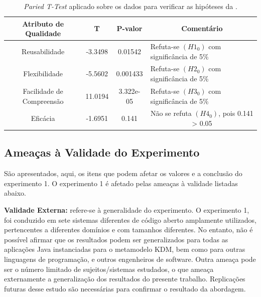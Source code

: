 \begin{table}[]
\centering
\caption{\textit{Paried T-Test} aplicado sobre os dados para verificar as hipóteses da .}
\label{tab:experimento_1_10_15}
\begin{tabular}{|m{1cm}|l|l|m{7.1cm}|}
\hline
\multicolumn{1}{|c|}{Atributo de Qualidade} & \multicolumn{1}{c|}{T} & \multicolumn{1}{c|}{P-valor} & \multicolumn{1}{c|}{Comentário} \\ \hline
\multicolumn{1}{|c|}{Reusabilidade} & \multicolumn{1}{c|}{-3.3498} & \multicolumn{1}{c|}{0.01542} & Refuta-se \textbf{$(H1_{0})$} com significância de 5\%\\ \hline
\multicolumn{1}{|c|}{Flexibilidade} &\multicolumn{1}{c|}{-5.5602}& \multicolumn{1}{c|}{0.001433} &Refuta-se \textbf{$(H2_{0})$} com significância de 5\%\\ \hline
\multicolumn{1}{|c|}{Facilidade de Compreensão} & \multicolumn{1}{c|}{11.0194} &    \multicolumn{1}{c|}{3.322e-05}&Refuta-se \textbf{$(H3_{0})$} com significância de 5\%\\ \hline
\multicolumn{1}{|c|}{Eficácia}&\multicolumn{1}{c|}{-1.6951}&\multicolumn{1}{c|}{0.141}&\multicolumn{1}{c|}{Não se refuta \textbf{$(H4_{0})$}, pois 0.141 > 0.05}\\ \hline
\end{tabular}
\end{table}

\subsection{Ameaças à Validade do Experimento}
São apresentados, aqui,  os itens que podem afetar os valores e a conclusão do experimento 1. O experimento 1 é afetado pelas ameaças à validade listadas abaixo.

\textbf{Validade Externa:} refere-se à generalidade do experimento. O experimento 1, foi conduzido em sete sistemas diferentes de código aberto amplamente utilizados, pertencentes a diferentes domínios e com tamanhos diferentes. No entanto, não é possível afirmar que os resultados podem ser generalizados para todas as aplicações Java instanciadas para o metamodelo KDM, bem como para outras linguagens de programação, e outros engenheiros de software. Outra ameaça pode ser o número limitado de sujeitos/sistemas estudados, o que ameaça externamente a generalização dos resultados do presente trabalho. Replicações futuras desse estudo são necessárias para confirmar o resultado da abordagem.


